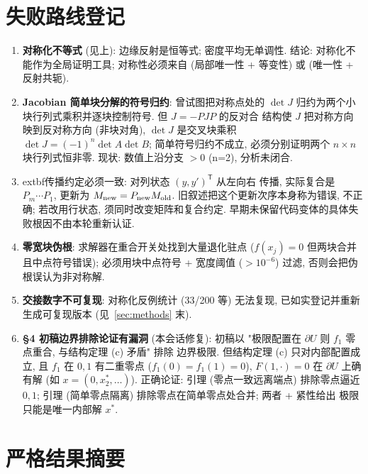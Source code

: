 \documentclass[UTF8]{ctexart}
\begin{document}
\section{失败路线登记}\label{sec:failures}

\begin{enumerate}
	\item \textbf{对称化不等式} (见上): 边缘反射是恒等式; 密度平均无单调性.
	结论: 对称化不能作为全局证明工具; 对称性必须来自 (局部唯一性 + 等变性)
	或 (唯一性 + 反射共轭).
	\item \textbf{Jacobian 简单块分解的符号归约}: 曾试图把对称点处的
	$\det J$ 归约为两个小块行列式乘积并逐块控制符号. 但 $J=-PJP$ 的反对合
	结构使 $J$ 把对称方向映到反对称方向 (非块对角), $\det J$ 是交叉块乘积
	$\det J=(-1)^n\det A\det B$; 简单符号归约不成立, 必须分别证明两个
	$n\times n$ 块行列式恒非零. 现状: 数值上沿分支 $>0$ (n=2), 分析未闭合.
	\item 	extbf{传播约定必须一致}: 对列状态 $(y,y')^{\mathsf T}$ 从左向右
传播, 实际复合是 $P_m\cdots P_1$, 更新为 $M_{\rm new}=P_{\rm new}M_{\rm old}$.
旧叙述把这个更新次序本身称为错误, 不正确; 若改用行状态, 须同时改变矩阵和复合约定.
早期未保留代码变体的具体失败根因不由本轮重新认证.
	\item \textbf{零宽块伪根}: 求解器在重合开关处找到大量退化驻点
	($f(x_j)=0$ 但两块合并且中点符号错误); 必须用块中点符号 + 宽度阈值
	($>10^{-6}$) 过滤, 否则会把伪根误认为非对称解.
	\item \textbf{交接数字不可复现}: 对称化反例统计 (33/200 等) 无法复现,
	已如实登记并重新生成可复现版本 (见~\ref{sec:methods} 末).
	\item \textbf{§4 初稿边界排除论证有漏洞} (本会话修复): 初稿以
	"极限配置在 $\partial U$ 则 $f_1$ 零点重合, 与结构定理 (c) 矛盾" 排除
	边界极限. 但结构定理 (c) 只对内部配置成立, 且 $f_1$ 在 $0,1$ 有二重零点
	($f_1(0)=f_1(1)=0$), $F(1,\cdot)=0$ 在 $\partial U$ 上确有解 (如
	$x=(0,x_2^*,\dots)$). 正确论证: 引理 (零点一致远离端点) 排除零点逼近
	$0,1$; 引理 (简单零点隔离) 排除零点在简单零点处合并; 两者 + 紧性给出
	极限只能是唯一内部解 $x^*$.
\end{enumerate}

\section{严格结果摘要}\label{sec:strict}
\end{document}
